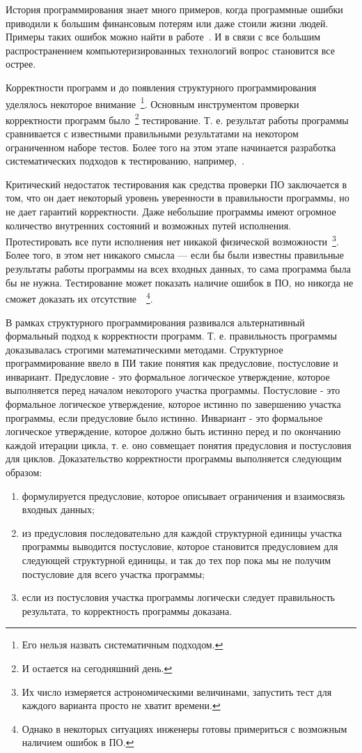 История программирования знает много примеров, когда программные ошибки приводили к большим финансовым потерям или даже стоили жизни людей. Примеры таких ошибок можно найти в работе~\cite{Zhivich:2009:RCSE}. И в связи с все большим распространением компьютеризированных технологий вопрос становится все острее.

Корректности программ и до появления структурного программирования уделялось некоторое внимание~\footnote{Его нельзя назвать систематичным подходом.}. Основным инструментом проверки корректности программ было~\footnote{И остается на сегодняшний день.} тестирование. Т. е. результат работы программы сравнивается с известными правильными результатами на некотором ограниченном наборе тестов. Более того на этом этапе начинается разработка систематических подходов к тестированию, например,~\cite{Myers:1979:AST}.

Критический недостаток тестирования как средства проверки ПО заключается в том, что он дает некоторый уровень уверенности в правильности программы, но не дает гарантий корректности. Даже небольшие программы имеют огромное количество внутренних состояний и возможных путей исполнения. Протестировать все пути исполнения нет никакой физической возможности~\footnote{Их число измеряется астрономическими величинами, запустить тест для каждого варианта просто не хватит времени.}. Более того, в этом нет никакого смысла — если бы были известны правильные результаты работы программы на всех входных данных, то сама программа была бы не нужна. Тестирование может показать наличие ошибок в ПО, но никогда не сможет доказать их отсутствие~\cite{Dijkstra:1972:CIN}~\footnote{Однако в некоторых ситуациях инженеры готовы примериться с возможным наличием ошибок в ПО.}.

В рамках структурного программирования развивался альтернативный формальный подход к корректности программ. Т. е. правильность программы доказывалась строгими математическими методами. Структурное программирование ввело в ПИ такие понятия как предусловие, постусловие и инвариант. Предусловие - это формальное логическое утверждение, которое выполняется перед началом некоторого участка программы. Постусловие - это формальное логическое утверждение, которое истинно по завершению участка программы, если предусловие было истинно. Инвариант - это формальное логическое утверждение, которое должно быть истинно перед и по окончанию каждой итерации цикла, т. е. оно совмещает понятия предусловия и постусловия для циклов. Доказательство корректности программы выполняется следующим образом:
\begin{enumerate}
  \item формулируется предусловие, которое описывает ограничения и взаимосвязь входных данных;
  \item из предусловия последовательно для каждой структурной единицы участка программы выводится постусловие, которое становится предусловием для следующей структурной единицы, и так до тех пор пока мы не получим постусловие для всего участка программы;
  \item если из постусловия участка программы логически следует правильность результата, то корректность программы доказана.
\end{enumerate}

